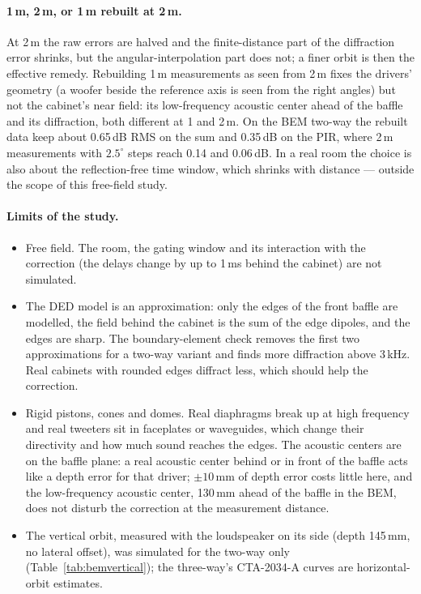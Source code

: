 \documentclass[11pt,a4paper]{article}
\begin{document}
\paragraph{1\,m, 2\,m, or 1\,m rebuilt at 2\,m.} At 2\,m the raw errors are halved and the finite-distance
part of the diffraction error shrinks, but the angular-interpolation part does not; a finer orbit is then
the effective remedy. Rebuilding 1\,m measurements as seen from 2\,m fixes the drivers' geometry (a woofer
beside the reference axis is seen from the right angles) but not the cabinet's near field: its
low-frequency acoustic center ahead of the baffle and its diffraction, both different at 1 and 2\,m. On the
BEM two-way the rebuilt data keep about 0.65\,dB RMS on the sum and 0.35\,dB on the PIR, where 2\,m
measurements with $2.5^\circ$ steps reach 0.14 and 0.06\,dB. In a real room the choice is also about the
reflection-free time window, which shrinks with distance --- outside the scope of this free-field study.

\paragraph{Limits of the study.}
\begin{itemize}
  \item Free field. The room, the gating window and its interaction with the correction (the delays
  change by up to 1\,ms behind the cabinet) are not simulated.
  \item The DED model is an approximation: only the edges of the front baffle are modelled, the field
  behind the cabinet is the sum of the edge dipoles, and the edges are sharp. The boundary-element check
  removes the first two approximations for a two-way variant and finds more diffraction above 3\,kHz.
  Real cabinets with rounded edges diffract less, which should help the correction.
  \item Rigid pistons, cones and domes. Real diaphragms break up at high frequency and real tweeters sit
  in faceplates or waveguides, which change their directivity and how much sound reaches the edges.
  The acoustic centers are on the baffle plane: a real acoustic center behind or in front of the baffle
  acts like a depth error for that driver; $\pm10$\,mm of depth error costs little here, and the
  low-frequency acoustic center, 130\,mm ahead of the baffle in the BEM, does not disturb the
  correction at the measurement distance.
  \item The vertical orbit, measured with the loudspeaker on its side (depth 145\,mm, no lateral offset),
  was simulated for the two-way only (Table~\ref{tab:bemvertical}); the three-way's CTA-2034-A curves are
  horizontal-orbit estimates.
\end{itemize}
\end{document}
